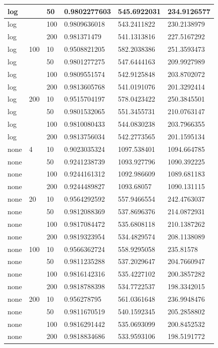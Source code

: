 \documentclass[11pt,letterpaper]{article}
\begin{document}
\begin{table}[!ht]
\begin{tabular}{|l|l|l|l|l|l|}
        log & ~ & 50 & 0.9802277603 & 545.6922031 & 234.9126577 \\ \hline
        log & ~ & 100 & 0.9809636018 & 543.2411822 & 230.2138979 \\ \hline
        log & ~ & 200 & 0.981371479 & 541.1313816 & 227.5167292 \\ \hline
        log & 100 & 10 & 0.9508821205 & 582.2038386 & 251.3593473 \\ \hline
        log & ~ & 50 & 0.9801277275 & 547.6444163 & 209.9927989 \\ \hline
        log & ~ & 100 & 0.9809551574 & 542.9125848 & 203.8702072 \\ \hline
        log & ~ & 200 & 0.9813605768 & 541.0191076 & 201.3292414 \\ \hline
        log & 200 & 10 & 0.9515704197 & 578.0423422 & 250.3845501 \\ \hline
        log & ~ & 50 & 0.9801532065 & 551.3455731 & 210.0763147 \\ \hline
        log & ~ & 100 & 0.9810080433 & 544.0830238 & 203.7966355 \\ \hline
        log & ~ & 200 & 0.9813756034 & 542.2773565 & 201.1595134 \\ \hline
        none & 4 & 10 & 0.9023035324 & 1097.538401 & 1094.664785 \\ \hline
        none & ~ & 50 & 0.9241238739 & 1093.927796 & 1090.392225 \\ \hline
        none & ~ & 100 & 0.9244161312 & 1092.986609 & 1089.681183 \\ \hline
        none & ~ & 200 & 0.9244489827 & 1093.68057 & 1090.131115 \\ \hline
        none & 20 & 10 & 0.9564292592 & 557.9466554 & 242.4763037 \\ \hline
        none & ~ & 50 & 0.9812088369 & 537.8696376 & 214.0872931 \\ \hline
        none & ~ & 100 & 0.9817084472 & 535.6808118 & 210.1387262 \\ \hline
        none & ~ & 200 & 0.9819323954 & 534.4829574 & 208.1138089 \\ \hline
        none & 100 & 10 & 0.9566362724 & 558.9295058 & 235.81578 \\ \hline
        none & ~ & 50 & 0.9811235288 & 537.2029647 & 204.7660947 \\ \hline
        none & ~ & 100 & 0.9816142316 & 535.4227102 & 200.3857282 \\ \hline
        none & ~ & 200 & 0.9818788398 & 534.7722537 & 198.3342015 \\ \hline
        none & 200 & 10 & 0.956278795 & 561.0361648 & 236.9948476 \\ \hline
        none & ~ & 50 & 0.9811670519 & 540.1592345 & 205.2858802 \\ \hline
        none & ~ & 100 & 0.9816291442 & 535.0693099 & 200.8452532 \\ \hline
        none & ~ & 200 & 0.9818834686 & 533.9593106 & 198.5191772 \\ \hline
    \end{tabular}
\end{table}
\end{document}
